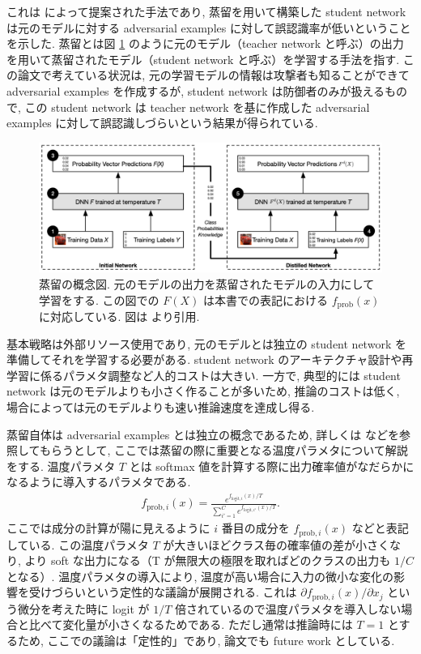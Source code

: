 これは \cite{papernot2016distillation} によって提案された手法であり, 蒸留を用いて構築した student network は元のモデルに対する adversarial examples に対して誤認識率が低いということを示した.
蒸留とは図 \ref{fig:distillation-as-summary} のように元のモデル（teacher network と呼ぶ）の出力を用いて蒸留されたモデル（student network と呼ぶ）を学習する手法を指す.
この論文で考えている状況は, 元の学習モデルの情報は攻撃者も知ることができて adversarial examples を作成するが, student network は防御者のみが扱えるもので, この student network は teacher network を基に作成した adversarial examples に対して誤認識しづらいという結果が得られている.
%
\begin{figure}[htbp]
\begin{center}
\includegraphics[width=14.0cm]{figures/distillation-as-summary.pdf}
\end{center}
\caption{
蒸留の概念図.
元のモデルの出力を蒸留されたモデルの入力にして学習をする.
この図での $F(X)$ は本書での表記における $f_{\text{prob}}(x)$ に対応している.
図は \cite{papernot2016distillation} より引用.
}
\label{fig:distillation-as-summary}
\end{figure}

基本戦略は外部リソース使用であり, 元のモデルとは独立の student network を準備してそれを学習する必要がある.
student network のアーキテクチャ設計や再学習に係るパラメタ調整など人的コストは大きい.
一方で, 典型的には student network は元のモデルよりも小さく作ることが多いため, 推論のコストは低く, 場合によっては元のモデルよりも速い推論速度を達成し得る.

蒸留自体は adversarial examples とは独立の概念であるため, 詳しくは \cite{hinton2015distilling} などを参照してもらうとして, ここでは蒸留の際に重要となる温度パラメタについて解説をする.
温度パラメタ $T$ とは softmax 値を計算する際に出力確率値がなだらかになるように導入するパラメタである.
%
\begin{eqnarray}
f_{\text{prob}, i} (x) = \frac{e^{f_{\text{logit}, i}(x) / T}}{\sum_{i' = 1}^{C} e^{f_{\text{logit}, i'}(x) / T}}.
\label{eq:distillation-as-temp}
\end{eqnarray}
%
ここでは成分の計算が陽に見えるように $i$ 番目の成分を $f_{\text{prob}, i} (x)$ などと表記している.
この温度パラメタ $T$ が大きいほどクラス毎の確率値の差が小さくなり, より soft な出力になる（T が無限大の極限を取ればどのクラスの出力も $1 / C$ となる）.
温度パラメタの導入により, 温度が高い場合に入力の微小な変化の影響を受けづらいという定性的な議論が展開される.
これは $\partial f_{\text{prob}, i} (x) / \partial x_j$ という微分を考えた時に logit が $1/T$ 倍されているので温度パラメタを導入しない場合と比べて変化量が小さくなるためである.
ただし通常は推論時には $T=1$ とするため, ここでの議論は「定性的」であり, 論文でも future work としている.


